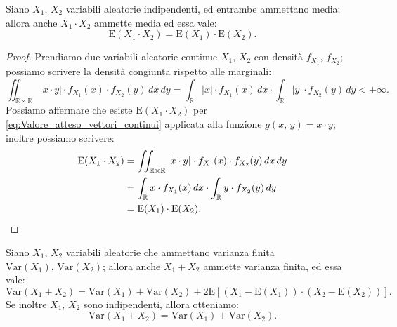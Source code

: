         \begin{prty}
            Siano $X_1,\,X_2$ variabili aleatorie indipendenti, ed entrambe ammettano media; allora anche $X_1 \cdot X_2$ ammette media ed essa vale:
            \begin{equation}\label{eq:Media_prodotto_v_a}
                \text{E}(X_1 \cdot X_2) = \text{E}(X_1) \cdot \text{E}(X_2)
            .\end{equation}
        \end{prty}
        \begin{proof}
            Prendiamo due variabili aleatorie continue $X_1,\,X_2$ con densità $f_{X_1},\, f_{X_2}$; possiamo scrivere la densità congiunta rispetto alle marginali: \[
                \iint_{\mathbb{R}\times\mathbb{R}} |x\cdot y| \cdot f_{X_1}(x) \cdot f_{X_2}(y)\, dx\, dy =
                \int_{\mathbb{R}} |x|\cdot f_{X_1}(x)\, dx \cdot \int_{\mathbb{R}} |y|\cdot f_{X_2}(y)\, dy 
                < +\infty
            .\] Possiamo affermare che esiste $\text{E}(X_1 \cdot X_2)$ per \eqref{eq:Valore_atteso_vettori_continui} applicata alla funzione $g(x,\,y) = x\cdot y$; inoltre possiamo scrivere:
            \begin{align*}
                \text{E}(X_1 \cdot X_2) &=
                \iint_{\mathbb{R}\times\mathbb{R}} |x\cdot y| \cdot f_{X_1}(x) \cdot f_{X_2}(y)\, dx\, dy \\
                &= \int_{\mathbb{R}} x\cdot f_{X_1}(x)\, dx \cdot \int_{\mathbb{R}} y\cdot f_{X_2}(y)\, dy \\
                &= \text{E}(X_1) \cdot \text{E}(X_2) \qedhere
            .\end{align*}
        \end{proof}
        \begin{prty}\label{prty:Varianza_somma_v_a}
            Siano $X_1,\,X_2$ variabili aleatorie che ammettano varianza finita $\text{Var}(X_1),\,\text{Var}(X_2)$; allora anche $X_1 + X_2$ ammette varianza finita, ed essa vale: \[
            \text{Var}(X_1 + X_2) = \text{Var}(X_1) + \text{Var}(X_2) + 
            2 \text{E}\left[(X_1 - \text{E}(X_1))\cdot(X_2 - \text{E}(X_2))\right]
            .\] Se inoltre $X_1,\,X_2$ sono \underline{indipendenti}, allora otteniamo:
            \begin{equation}\label{eq:Varianza_somma_v_a}
                \text{Var}(X_1 + X_2) = \text{Var}(X_1) + \text{Var}(X_2)
            .\end{equation}
        \end{prty}
